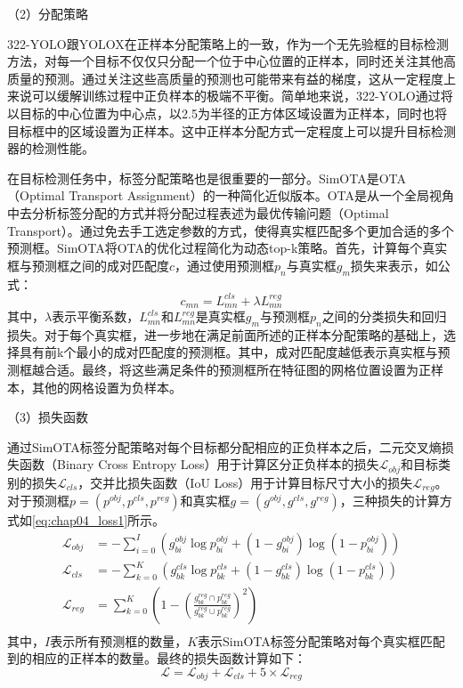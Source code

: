 （2）分配策略

322-YOLO跟YOLOX在正样本分配策略上的一致，作为一个无先验框的目标检测方法，对每一个目标不仅仅只分配一个位于中心位置的正样本，同时还关注其他高质量的预测。通过关注这些高质量的预测也可能带来有益的梯度，这从一定程度上来说可以缓解训练过程中正负样本的极端不平衡。简单地来说，322-YOLO通过将以目标的中心位置为中心点，以2.5为半径的正方体区域设置为正样本，同时也将目标框中的区域设置为正样本。这中正样本分配方式一定程度上可以提升目标检测器的检测性能。

在目标检测任务中，标签分配策略也是很重要的一部分。SimOTA是OTA（Optimal Transport Assignment）\cite{ge2021ota}的一种简化近似版本。OTA是从一个全局视角中去分析标签分配的方式并将分配过程表述为最优传输问题（Optimal Transport）。通过免去手工选定参数的方式，使得真实框匹配多个更加合适的多个预测框。SimOTA将OTA的优化过程简化为动态top-k策略。首先，计算每个真实框与预测框之间的成对匹配度\(c\)，通过使用预测框\(p_n\)与真实框\(g_m\)损失来表示，如公式：
\begin{equation}
  c_{mn} = L^{cls}_{mn} + \lambda L^{reg}_{mn}
\end{equation}
其中，\(\lambda\)表示平衡系数，\(L^{cls}_{mn}\)和\(L^{reg}_{mn}\)是真实框\(g_m\)与预测框\(p_n\)之间的分类损失和回归损失。对于每个真实框，进一步地在满足前面所述的正样本分配策略的基础上，选择具有前k个最小的成对匹配度的预测框。其中，成对匹配度越低表示真实框与预测框越合适。最终，将这些满足条件的预测框所在特征图的网格位置设置为正样本，其他的网格设置为负样本。

（3）损失函数

通过SimOTA标签分配策略对每个目标都分配相应的正负样本之后，二元交叉熵损失函数（Binary Cross Entropy Loss）用于计算区分正负样本的损失\(\mathcal{L}_{obj}\)和目标类别的损失\(\mathcal{L}_{cls}\)，交并比损失函数（IoU Loss）用于计算目标尺寸大小的损失\(\mathcal{L}_{reg}\)。对于预测框\(p = (p^{obj}, p^{cls}, p^{reg})\)和真实框\(g = (g^{obj}, g^{cls}, g^{reg})\)，三种损失的计算方式如\ref{eq:chap04_loss1}所示。
\begin{equation}
  \begin{aligned}
    \mathcal{L}_{obj} & = -\sum_{i=0}^I( g^{obj}_{bi} \log p^{obj}_{bi} +  (1- g^{obj}_{bi})\log(1-p^{obj}_{bi} ))      \\
    \mathcal{L}_{cls} & = -\sum_{k=0}^K( g^{cls}_{bk} \log p^{cls}_{bk} +  (1- g^{cls}_{bk})\log(1-p^{cls}_{bk} ))      \\
    \mathcal{L}_{reg} & = \sum_{k=0}^K( 1 - (\frac{g^{reg}_{bk} \cap p^{reg}_{bk}}{g^{reg}_{bk} \cup p^{reg}_{bk}})^2 ) \\
  \end{aligned}
  \label{eq:chap04_loss1}
\end{equation}
其中，\(I\)表示所有预测框的数量，\(K\)表示SimOTA标签分配策略对每个真实框匹配到的相应的正样本的数量。最终的损失函数计算如下：
\begin{equation}
  \mathcal{L}  = \mathcal{L}_{obj} + \mathcal{L}_{cls} + 5 \times \mathcal{L}_{reg}
\end{equation}

